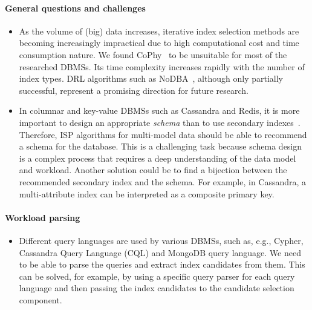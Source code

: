 \paragraph{General questions and challenges}
\begin{itemize}
    \item As the volume of (big) data increases, iterative index selection methods are becoming increasingly impractical due to high computational cost and time consumption nature. We found CoPhy~\citep{CoPhy11} to be unsuitable for most of the researched DBMSs. Its time complexity increases rapidly with the number of index types. DRL algorithms such as NoDBA~\citep{DRL}, although only partially successful, represent a promising direction for future research.
    
    \item In columnar and key-value DBMSs such as Cassandra and Redis, it is more important to design an appropriate \textit{schema} than to use secondary indexes~\citep{cassandraIndexes,RedisIndexes}. Therefore, ISP algorithms for multi-model data should be able to recommend a schema for the database. This is a challenging task because schema design is a complex process that requires a deep understanding of the data model and workload. Another solution could be to find a bijection between the recommended secondary index and the schema. For example, in Cassandra, a multi-attribute index can be interpreted as a composite primary key.
\end{itemize}

\paragraph{Workload parsing}
\begin{itemize}
    \item Different query languages are used by various DBMSs, such as, e.g., Cypher, Cassandra Query Language (CQL) and MongoDB query language. We need to be able to parse the queries and extract index candidates from them. This can be solved, for example, by using a specific query parser for each query language and then passing the index candidates to the candidate selection component.
\end{itemize}

